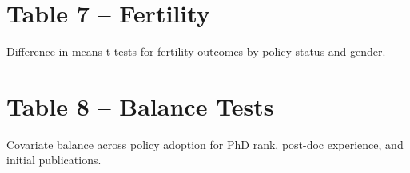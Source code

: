\documentclass[12pt]{article}
\begin{document}
\vspace{1em}


\clearpage
\section{Table 7 -- Fertility}

Difference-in-means t-tests for fertility outcomes by policy status and gender.

\vspace{1em}


\clearpage
\section{Table 8 -- Balance Tests}

Covariate balance across policy adoption for PhD rank, post-doc experience,
and initial publications.

\vspace{1em}

\end{document}
